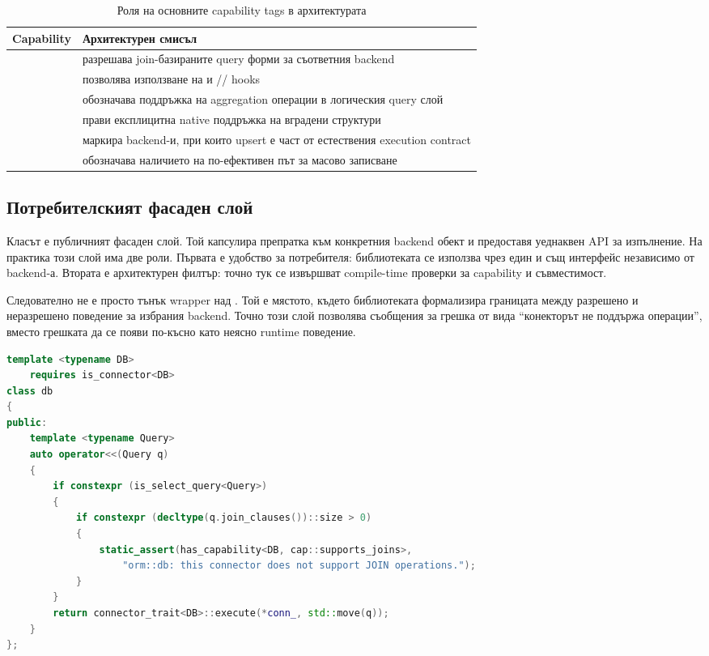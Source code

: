 \begin{table}[H]
\centering
\small
\caption{Роля на основните capability tags в архитектурата}
\label{tab:capability_tags}
\begin{tabularx}{\textwidth}{L{3.6cm}Y}
\toprule
\textbf{Capability} & \textbf{Архитектурен смисъл} \\
\midrule
{} & разрешава join-базираните query форми за съответния backend \\
 & позволява използване на  и // hooks \\
 & обозначава поддръжка на aggregation операции в логическия query слой \\
 & прави експлицитна native поддръжка на вградени структури \\
 & маркира backend-и, при които upsert е част от естествения execution contract \\
 & обозначава наличието на по-ефективен път за масово записване \\
\bottomrule
\end{tabularx}
\end{table}

\subsection{Потребителският фасаден слой }

Класът  е публичният фасаден слой. Той капсулира препратка към конкретния backend обект и предоставя уеднаквен API за изпълнение. На практика този слой има две роли. Първата е удобство за потребителя: библиотеката се използва чрез един и същ интерфейс независимо от backend-а. Втората е архитектурен филтър: точно тук се извършват compile-time проверки за capability и съвместимост.

Следователно  не е просто тънък wrapper над . Той е мястото, където библиотеката формализира границата между разрешено и неразрешено поведение за избрания backend. Точно този слой позволява съобщения за грешка от вида ``конекторът не поддържа  операции'', вместо грешката да се появи по-късно като неясно runtime поведение.

\begin{lstlisting}[language=C++,caption={Извадка от фасадния слой \code{db<DB>}},label={lst:db_facade}]
template <typename DB>
    requires is_connector<DB>
class db
{
public:
    template <typename Query>
    auto operator<<(Query q)
    {
        if constexpr (is_select_query<Query>)
        {
            if constexpr (decltype(q.join_clauses())::size > 0)
            {
                static_assert(has_capability<DB, cap::supports_joins>,
                    "orm::db: this connector does not support JOIN operations.");
            }
        }
        return connector_trait<DB>::execute(*conn_, std::move(q));
    }
};
\end{lstlisting}

